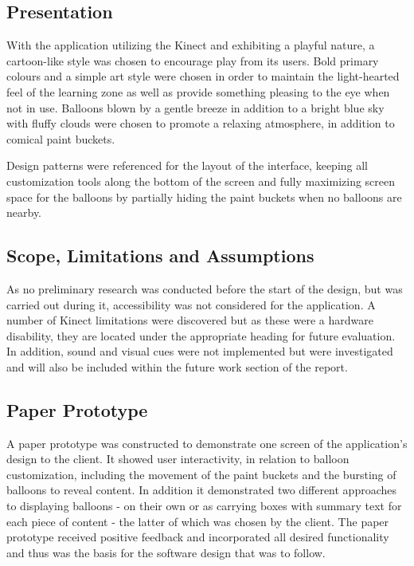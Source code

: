 \subsection{Presentation}
With the application utilizing the Kinect and exhibiting a playful nature, a cartoon-like style was chosen to encourage play from its users. Bold primary colours and a simple art style were chosen in order to maintain the light-hearted feel of the learning zone as well as provide something pleasing to the eye when not in use. Balloons blown by a gentle breeze in addition to a bright blue sky with fluffy clouds were chosen to promote a relaxing atmosphere, in addition to comical paint buckets.

Design patterns were referenced for the layout of the interface, keeping all customization tools along the bottom of the screen and fully maximizing screen space for the balloons by partially hiding the paint buckets when no balloons are nearby. 

\subsection{Scope, Limitations and Assumptions}
As no preliminary research was conducted before the start of the design, but was carried out during it, accessibility was not considered for the application. A number of Kinect limitations were discovered but as these were a hardware disability, they are located under the appropriate heading for future evaluation. In addition, sound and visual cues were not implemented but were investigated and will also be included within the future work section of the report.

\subsection{Paper Prototype}
A paper prototype was constructed to demonstrate one screen of the application's design to the client. It showed user interactivity, in relation to balloon customization, including the movement of the paint buckets and the bursting of balloons to reveal content. In addition it demonstrated two different approaches to displaying balloons - on their own or as carrying boxes with summary text for each piece of content - the latter of which was chosen by the client. The paper prototype received positive feedback and incorporated all desired functionality and thus was the basis for the software design that was to follow.

